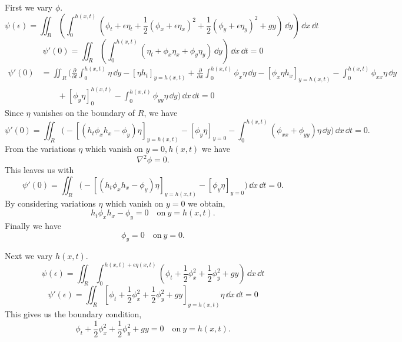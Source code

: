 \begin{Solution}
  First we vary $\phi$.
  \[
  \psi(\epsilon) = \iint_R \left( \int_0^{h(x,t)} 
    \left( \phi_t  + \epsilon \eta_t 
      + \frac{1}{2} (\phi_x + \epsilon \eta_x)^2
      + \frac{1}{2} (\phi_y + \epsilon \eta_y)^2 + g y \right) 
    \,\dd y \right) \,\dd x \,\dd t 
  \]
  \[
  \psi'(0) = \iint_R \left( \int_0^{h(x,t)} 
    \left( \eta_t + \phi_x \eta_x + \phi_y \eta_y \right) 
    \,\dd y \right) \,\dd x \,\dd t = 0
  \]
  \begin{align*}
    \psi'(0) &= \iint_R \bigg( 
    \frac{\partial}{\partial t} \int_0^{h(x,t)} \eta \,\dd y 
    - \left[ \eta h_t \right]_{y = h(x,t)}
    + \frac{\partial}{\partial x} \int_0^{h(x,t)} \phi_x \eta\,\dd y 
    - \left[ \phi_x \eta h_x \right]_{y = h(x,t)}
    - \int_0^{h(x,t)} \phi_{x x} \eta \,\dd y \\
    &\qquad + \left[ \phi_y \eta \right]_0^{h(x,t)} 
    - \int_0^{h(x,t)} \phi_{y y} \eta \,\dd y
    \bigg) \,\dd x \,\dd t = 0
  \end{align*}
  Since $\eta$ vanishes on the boundary of $R$, we have
  \[
  \psi'(0) = \iint_R \bigg( 
  - \left[ ( h_t \phi_x h_x - \phi_y ) \eta \right]_{y = h(x,t)}
  - \left[ \phi_y \eta \right]_{y = 0}
  - \int_0^{h(x,t)} ( \phi_{x x} + \phi_{y y}) \eta \,\dd y
  \bigg) \,\dd x \,\dd t = 0.
  \]
  From the variations $\eta$ which vanish on $y = 0, h(x,t)$ we have
  \[
  \boxed{
    \nabla^2 \phi = 0.
    }
  \]
  This leaves us with
  \[
  \psi'(0) = \iint_R \bigg( 
  - \left[ ( h_t \phi_x h_x - \phi_y ) \eta \right]_{y = h(x,t)}
  - \left[ \phi_y \eta \right]_{y = 0}
  \bigg) \,\dd x \,\dd t = 0.
  \]
  By considering variations $\eta$ which vanish on $y =0$ we obtain,
  \[
  \boxed{
    h_t \phi_x h_x - \phi_y = 0 \quad \mathrm{on}\ y = h(x,t).
    }
  \]
  Finally we have
  \[
  \boxed{
    \phi_y = 0 \quad \mathrm{on}\ y = 0.
    }
  \]

  Next we vary $h(x,t)$.
  \[
  \psi(\epsilon) = \iint_R \int_0^{h(x,t) + \epsilon \eta(x,t)} \left(
    \phi_t + \frac{1}{2} \phi_x^2 + \frac{1}{2} \phi_y^2 + g y
  \right) \,\dd x\,\dd t
  \]
  \[
  \psi'(\epsilon) = \iint_R \left[
    \phi_t + \frac{1}{2} \phi_x^2 + \frac{1}{2} \phi_y^2 + g y
  \right]_{y = h(x,t)} \eta \,\dd x\,\dd t = 0
  \]
  This gives us the boundary condition,
  \[
  \boxed{
    \phi_t + \frac{1}{2} \phi_x^2 + \frac{1}{2} \phi_y^2 + g y = 0 \quad
    \mathrm{on}\ y = h(x,t).
    }
  \]
\end{Solution}



